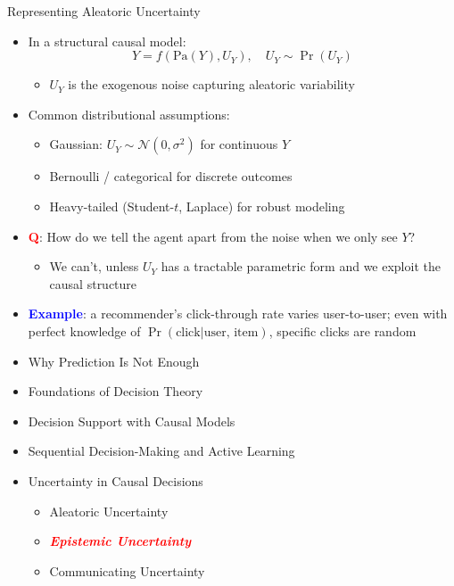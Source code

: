 \documentclass[
  10pt,
  ignorenonframetext,
]{beamer}
\providecommand{\tightlist}{%
  \setlength{\itemsep}{0pt}\setlength{\parskip}{0pt}}
\begin{document}
\begin{frame}{Representing Aleatoric Uncertainty}
\label{representing-aleatoric-uncertainty}
\begin{itemize}
\tightlist
\item
  In a structural causal model: \[
  Y = f(\text{Pa}(Y), U_Y), \quad U_Y \sim \Pr(U_Y)
  \]

  \begin{itemize}
  \tightlist
  \item
    \(U_Y\) is the exogenous noise capturing aleatoric variability
  \end{itemize}
\item
  Common distributional assumptions:

  \begin{itemize}
  \tightlist
  \item
    Gaussian: \(U_Y \sim \mathcal{N}(0, \sigma^2)\) for continuous \(Y\)
  \item
    Bernoulli / categorical for discrete outcomes
  \item
    Heavy-tailed (Student-\(t\), Laplace) for robust modeling
  \end{itemize}
\item
  \textbf{\textcolor{red}{Q}}: How do we tell the agent apart from the
  noise when we only see \(Y\)?

  \begin{itemize}
  \tightlist
  \item
    We can't, unless \(U_Y\) has a tractable parametric form and we
    exploit the causal structure
  \end{itemize}
\item
  \textbf{\textcolor{blue}{Example}}: a recommender's click-through rate
  varies user-to-user; even with perfect knowledge of
  \(\Pr(\text{click} | \text{user, item})\), specific clicks are random
\end{itemize}
\end{frame}

\begin{frame}{}
\label{section-18}
\begin{itemize}
\tightlist
\item
  Why Prediction Is Not Enough
\item
  Foundations of Decision Theory
\item
  Decision Support with Causal Models
\item
  Sequential Decision-Making and Active Learning
\item
  Uncertainty in Causal Decisions

  \begin{itemize}
  \tightlist
  \item
    Aleatoric Uncertainty
  \item
    \emph{\textbf{\textcolor{red}{Epistemic Uncertainty}}}
  \item
    Communicating Uncertainty
  \end{itemize}
\end{itemize}
\end{frame}
\end{document}
